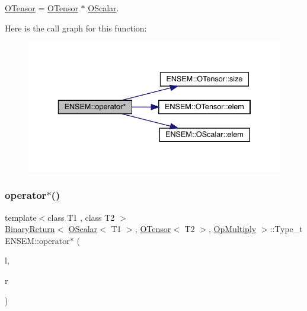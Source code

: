 \mbox{\hyperlink{classENSEM_1_1OTensor}{O\+Tensor}} = \mbox{\hyperlink{classENSEM_1_1OTensor}{O\+Tensor}} $\ast$ \mbox{\hyperlink{classENSEM_1_1OScalar}{O\+Scalar}}. 

Here is the call graph for this function\+:\nopagebreak
\begin{figure}[H]
\begin{center}
\leavevmode
\includegraphics[width=336pt]{de/d87/group__obstensor_gad60dc9814d8cddbdf21babfd0bff14c4_cgraph}
\end{center}
\end{figure}
\mbox{\label{group__obstensor_gacf15f85a2bbaf20f2ccb489bd28690c6}} 
\subsubsection{\texorpdfstring{operator$\ast$()}{operator*()}\hspace{0.1cm}{\footnotesize\ttfamily [3/3]}}
{\footnotesize\ttfamily template$<$class T1 , class T2 $>$ \\
\mbox{\hyperlink{structENSEM_1_1BinaryReturn}{Binary\+Return}}$<$ \mbox{\hyperlink{classENSEM_1_1OScalar}{O\+Scalar}}$<$ T1 $>$, \mbox{\hyperlink{classENSEM_1_1OTensor}{O\+Tensor}}$<$ T2 $>$, \mbox{\hyperlink{structENSEM_1_1OpMultiply}{Op\+Multiply}} $>$\+::Type\+\_\+t E\+N\+S\+E\+M\+::operator$\ast$ (\begin{DoxyParamCaption}\item[{const \mbox{\hyperlink{classENSEM_1_1OScalar}{O\+Scalar}}$<$ T1 $>$ \&}]{l,  }\item[{const \mbox{\hyperlink{classENSEM_1_1OTensor}{O\+Tensor}}$<$ T2 $>$ \&}]{r }\end{DoxyParamCaption})\hspace{0.3cm}{\ttfamily [inline]}}



